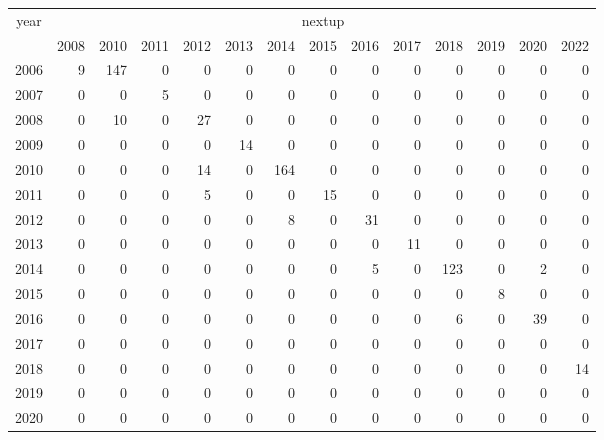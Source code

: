 \footnotesize\begin{tabular}[t]{lrrrrrrrrrrrrr}
\toprule
\multicolumn{1}{c}{year} & \multicolumn{13}{c}{nextup} \\
\cmidrule(l{3pt}r{3pt}){1-1} \cmidrule(l{3pt}r{3pt}){2-14}
  & 2008 & 2010 & 2011 & 2012 & 2013 & 2014 & 2015 & 2016 & 2017 & 2018 & 2019 & 2020 & 2022\\
\midrule
2006 & 9 & 147 & 0 & 0 & 0 & 0 & 0 & 0 & 0 & 0 & 0 & 0 & 0\\
2007 & 0 & 0 & 5 & 0 & 0 & 0 & 0 & 0 & 0 & 0 & 0 & 0 & 0\\
2008 & 0 & 10 & 0 & 27 & 0 & 0 & 0 & 0 & 0 & 0 & 0 & 0 & 0\\
2009 & 0 & 0 & 0 & 0 & 14 & 0 & 0 & 0 & 0 & 0 & 0 & 0 & 0\\
2010 & 0 & 0 & 0 & 14 & 0 & 164 & 0 & 0 & 0 & 0 & 0 & 0 & 0\\
2011 & 0 & 0 & 0 & 5 & 0 & 0 & 15 & 0 & 0 & 0 & 0 & 0 & 0\\
2012 & 0 & 0 & 0 & 0 & 0 & 8 & 0 & 31 & 0 & 0 & 0 & 0 & 0\\
2013 & 0 & 0 & 0 & 0 & 0 & 0 & 0 & 0 & 11 & 0 & 0 & 0 & 0\\
2014 & 0 & 0 & 0 & 0 & 0 & 0 & 0 & 5 & 0 & 123 & 0 & 2 & 0\\
2015 & 0 & 0 & 0 & 0 & 0 & 0 & 0 & 0 & 0 & 0 & 8 & 0 & 0\\
2016 & 0 & 0 & 0 & 0 & 0 & 0 & 0 & 0 & 0 & 6 & 0 & 39 & 0\\
2017 & 0 & 0 & 0 & 0 & 0 & 0 & 0 & 0 & 0 & 0 & 0 & 0 & 0\\
2018 & 0 & 0 & 0 & 0 & 0 & 0 & 0 & 0 & 0 & 0 & 0 & 0 & 14\\
2019 & 0 & 0 & 0 & 0 & 0 & 0 & 0 & 0 & 0 & 0 & 0 & 0 & 0\\
2020 & 0 & 0 & 0 & 0 & 0 & 0 & 0 & 0 & 0 & 0 & 0 & 0 & 0\\
\bottomrule
\end{tabular}
